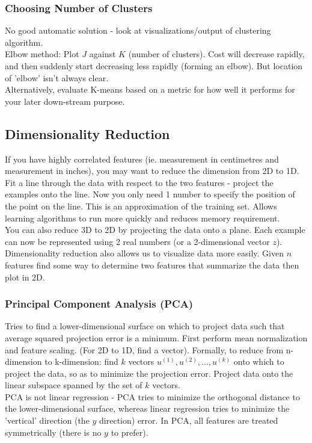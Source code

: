 \documentclass[11pt,letterpaper]{article}
\begin{document}
\subsubsection{Choosing Number of Clusters}
No good automatic solution - look at visualizations/output of clustering algorithm.\\
Elbow method: Plot $J$ against $K$ (number of clusters). Cost will decrease rapidly, and then suddenly start decreasing less rapidly (forming an elbow). But location of 'elbow' isn't always clear.\\
Alternatively, evaluate K-means based on a metric for how well it performs for your later down-stream purpose.
\subsection{Dimensionality Reduction}
If you have highly correlated features (ie. measurement in centimetres and measurement in inches), you may want to reduce the dimension from 2D to 1D. Fit a line through the data with respect to the two features - project the examples onto the line. Now you only need 1 number to specify the position of the point on the line. This is an approximation of the training set. Allows learning algorithms to run more quickly and reduces memory requirement.\\
You can also reduce 3D to 2D by projecting the data onto a plane. Each example can now be represented using 2 real numbers (or a 2-dimensional vector $z$).\\
Dimensionality reduction also allows us to visualize data more easily. Given $n$ features find some way to determine two features that summarize the data then plot in 2D.
\subsubsection{Principal Component Analysis (PCA)}
Tries to find a lower-dimensional surface on which to project data such that average squared projection error is a minimum. First perform mean normalization and feature scaling. (For 2D to 1D, find a vector). Formally, to reduce from n-dimension to k-dimension: find $k$ vectors $u^{(1)}, u^{(2)}, ..., u^{(k)}$ onto which to project the data, so as to minimize the projection error. Project data onto the linear subspace spanned by the set of $k$ vectors.\\
PCA is not linear regression - PCA tries to minimize the orthogonal distance to the lower-dimensional surface, whereas linear regression tries to minimize the 'vertical' direction (the $y$ direction) error. In PCA, all features are treated symmetrically (there is no $y$ to prefer).
\end{document}
